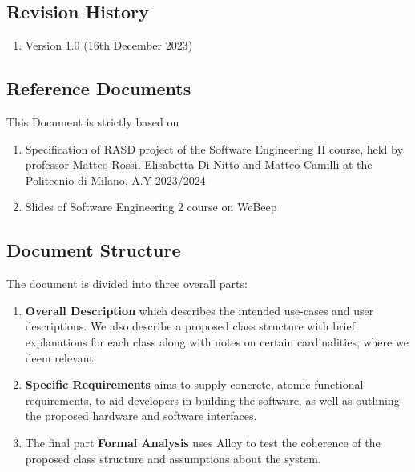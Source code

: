 \subsection{Revision History}
\begin{enumerate}
    \item Version 1.0 (16th December 2023)
\end{enumerate}



\subsection{Reference Documents}
This Document is strictly based on 
\begin{enumerate}
    \item Specification of RASD project of the Software Engineering II course, held by professor Matteo Rossi, Elisabetta Di Nitto and Matteo Camilli at the Politecnio di Milano, A.Y 2023/2024
    \item Slides of Software Engineering 2 course on WeBeep
\end{enumerate}

\subsection{Document Structure}
The document is divided into three overall parts:
\begin{enumerate}
    \item \textbf{Overall Description} which describes the intended use-cases and user descriptions. We also describe a proposed class structure with brief explanations for each class along with notes on certain cardinalities, where we deem relevant.
    \item \textbf{Specific Requirements} aims to supply concrete, atomic functional requirements, to aid developers in building the software, as well as outlining the proposed hardware and software interfaces. 
    \item The final part \textbf{Formal Analysis} uses Alloy to test the coherence of the proposed class structure and assumptions about the system.
\end{enumerate}

\newpage